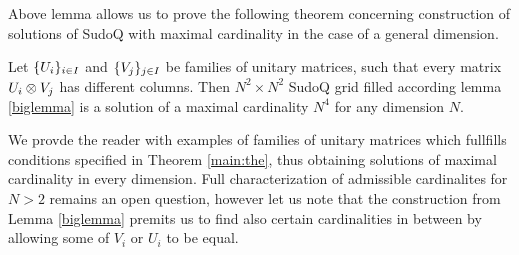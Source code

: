 \documentclass[11pt]{article}
\begin{document}
Above lemma allows us to prove the following theorem concerning construction of solutions of SudoQ with maximal cardinality in the case of a general dimension.
\begin{theorem}\label{main:the}
    Let $\{\mathnormal{U}_i\}_{i\in I}$ and  $\{\mathnormal{V}_j\}_{j\in I}$ be families of unitary matrices, such that every matrix $\mathnormal{U}_i\otimes\mathnormal{V}_j$ has different columns. Then $N^2\times N^2$ SudoQ grid filled according lemma \ref{biglemma} is a solution of a maximal cardinality $N^{4}$ for any dimension $N$.
\end{theorem}

We provde the reader with examples of families of unitary matrices which fullfills conditions specified in Theorem \ref{main:the}, thus obtaining solutions of maximal cardinality in every dimension. Full characterization of admissible cardinalites for $N>2$ remains an open question, however let us note that the construction from Lemma \ref{biglemma} premits us to find also certain cardinalities in between by allowing some of $V_i$ or $U_i$ to be equal. 
\end{document}
